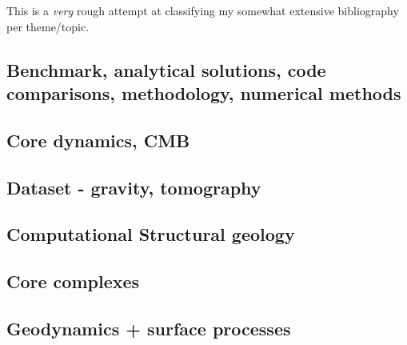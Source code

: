 This is a {\it very} rough attempt at classifying my somewhat extensive 
bibliography per theme/topic.
 


\subsection*{Benchmark, analytical solutions, code comparisons, methodology, numerical methods}

\cite{yusa84}
\cite{zhon96}
\cite{rist97}
\cite{lind99}
\cite{zhmt08}\cite{deka08}
\cite{dumg11}
\cite{lelk15}\cite{rumi15}
\cite{dumy16}
\cite{robh17}
\cite{clhe19}

\subsection*{Core dynamics, CMB}

\cite{hayu96}
\cite{lahb08}

\subsection*{Dataset - gravity, tomography}

\cite{dzan81}
\cite{hawj12}

\subsection*{Computational Structural geology}

\cite{acgf00}

\subsection*{Core complexes}

\cite{lehm12}

\subsection*{Geodynamics + surface processes}

\cite{howa94}
\cite{deea98}
\cite{avbu96}
\cite{zemk01}
\cite{lave05}
\cite{rosw06}
\cite{alle08}\cite{rowf08}
\cite{robr11}
\cite{vehc13}

